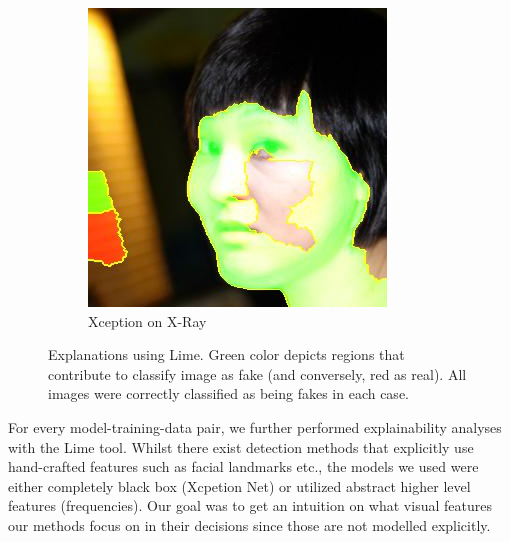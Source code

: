 \documentclass[11pt]{article}
\begin{document}
\begin{figure}
    
    \begin{subfigure}[b]{0.2\textwidth}
        \includegraphics[width=\textwidth]{figures/xception_xray_fake.jpeg}
        \caption{Xception on X-Ray}
        \label{fig:xception-xray}
    \end{subfigure}
    \caption{Explanations using Lime. Green color depicts regions that contribute to classify image as fake (and conversely, red as real). All images were correctly classified as being fakes in each case.}\label{fig:explanations}
\end{figure}
For every model-training-data pair, we further performed explainability analyses with the Lime tool. Whilst there exist detection methods that explicitly use hand-crafted features such as facial landmarks etc., the models we used were either completely black box (Xcpetion Net) or utilized abstract higher level features (frequencies). Our goal was to get an intuition on what visual features our methods focus on in their decisions since those are not modelled explicitly.
\end{document}
